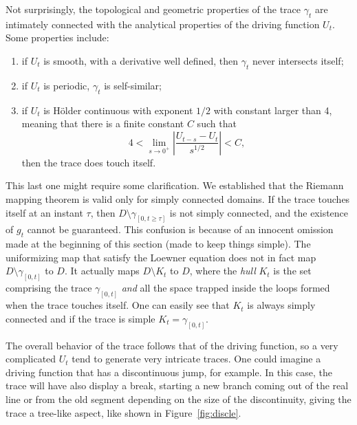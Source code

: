 Not surprisingly, the topological and geometric properties of the trace
$\gamma_t$ are intimately connected with the analytical properties of the
driving function $U_t$. Some properties include:
\begin{enumerate}
    \item if $U_t$ is smooth, with a derivative well defined, then $\gamma_t$
        never intersects itself;
    \item if $U_t$ is periodic, $\gamma_t$ is self-similar;
    \item if $U_t$ is H\"older continuous with exponent $1/2$ with constant
        larger than 4, meaning that there is a finite constant $C$ such that
        \begin{equation}
            4<\lim_{s\rightarrow0^{+}}\left|
                \frac{U_{t-s}-U_{t}}{s^{1/2}}\right|
            <C,
        \end{equation}
        then the trace does touch itself.
\end{enumerate}
This last one might require some clarification. We established that the Riemann
mapping theorem is valid only for simply connected domains. If the trace touches
itself at an instant $\tau$, then $D\setminus\gamma_{[0,t\geq\tau]}$ is not
simply connected, and the existence of $g_t$ cannot be guaranteed. This
confusion is because of an innocent omission made at the beginning of this
section (made to keep things simple). The uniformizing map that satisfy the
Loewner equation does not in fact map $D\setminus\gamma_{[0,t]}$ to $D$. It
actually maps $D\setminus K_t$ to $D$, where the \textit{hull} $K_t$ is the set
comprising the trace $\gamma_{[0,t]}$ \textit{and} all the space trapped inside
the loops formed when the trace touches itself. One can easily see that $K_t$
is always simply connected and if the trace is simple $K_t = \gamma_{[0,t]}$.

The overall behavior of the trace follows that of the driving function, so a
very complicated $U_t$ tend to generate very intricate traces. One could
imagine a driving function that has a discontinuous jump, for example. In this
case, the trace will have also display a break, starting a new branch coming
out of the real line or from the old segment depending on the size of the
discontinuity, giving the trace a tree-like aspect, like shown in
Figure~\ref{fig:discle}.


